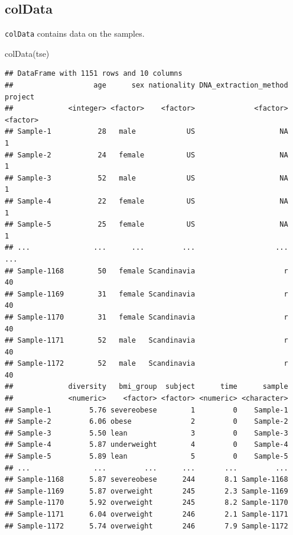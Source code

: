 \documentclass[
]{book}
\newenvironment{Shaded}{\begin{snugshade}}{\end{snugshade}}
\newcommand{\FunctionTok}[1]{\textcolor[rgb]{0.00,0.00,0.00}{#1}}
\newcommand{\NormalTok}[1]{#1}
\begin{document}
\hypertarget{coldata}{%
\subsection{colData}\label{coldata}}

\texttt{colData} contains data on the samples.

\begin{Shaded}
\begin{Highlighting}[]
\FunctionTok{colData}\NormalTok{(tse)}
\end{Highlighting}
\end{Shaded}

\begin{verbatim}
## DataFrame with 1151 rows and 10 columns
##                   age      sex nationality DNA_extraction_method  project
##             <integer> <factor>    <factor>              <factor> <factor>
## Sample-1           28   male            US                    NA        1
## Sample-2           24   female          US                    NA        1
## Sample-3           52   male            US                    NA        1
## Sample-4           22   female          US                    NA        1
## Sample-5           25   female          US                    NA        1
## ...               ...      ...         ...                   ...      ...
## Sample-1168        50   female Scandinavia                     r       40
## Sample-1169        31   female Scandinavia                     r       40
## Sample-1170        31   female Scandinavia                     r       40
## Sample-1171        52   male   Scandinavia                     r       40
## Sample-1172        52   male   Scandinavia                     r       40
##             diversity   bmi_group  subject      time      sample
##             <numeric>    <factor> <factor> <numeric> <character>
## Sample-1         5.76 severeobese        1         0    Sample-1
## Sample-2         6.06 obese              2         0    Sample-2
## Sample-3         5.50 lean               3         0    Sample-3
## Sample-4         5.87 underweight        4         0    Sample-4
## Sample-5         5.89 lean               5         0    Sample-5
## ...               ...         ...      ...       ...         ...
## Sample-1168      5.87 severeobese      244       8.1 Sample-1168
## Sample-1169      5.87 overweight       245       2.3 Sample-1169
## Sample-1170      5.92 overweight       245       8.2 Sample-1170
## Sample-1171      6.04 overweight       246       2.1 Sample-1171
## Sample-1172      5.74 overweight       246       7.9 Sample-1172
\end{verbatim}
\end{document}
